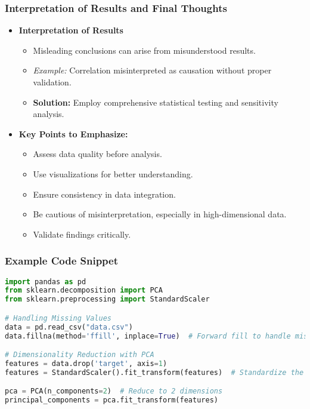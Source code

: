 \documentclass[aspectratio=169]{beamer}
\begin{document}
\begin{frame}
    \frametitle{Interpretation of Results and Final Thoughts}
    \begin{itemize}
        \item \textbf{Interpretation of Results}
            \begin{itemize}
                \item Misleading conclusions can arise from misunderstood results.
                \item \textit{Example:} Correlation misinterpreted as causation without proper validation.
                \item \textbf{Solution:} Employ comprehensive statistical testing and sensitivity analysis.
            \end{itemize}
        
        \item \textbf{Key Points to Emphasize:}
            \begin{itemize}
                \item Assess data quality before analysis.
                \item Use visualizations for better understanding.
                \item Ensure consistency in data integration.
                \item Be cautious of misinterpretation, especially in high-dimensional data.
                \item Validate findings critically.
            \end{itemize}
    \end{itemize}
\end{frame}

\begin{frame}[fragile]
    \frametitle{Example Code Snippet}
    \begin{lstlisting}[language=Python]
import pandas as pd
from sklearn.decomposition import PCA
from sklearn.preprocessing import StandardScaler

# Handling Missing Values
data = pd.read_csv("data.csv")
data.fillna(method='ffill', inplace=True)  # Forward fill to handle missing values

# Dimensionality Reduction with PCA
features = data.drop('target', axis=1)
features = StandardScaler().fit_transform(features)  # Standardize the features

pca = PCA(n_components=2)  # Reduce to 2 dimensions
principal_components = pca.fit_transform(features)
    \end{lstlisting}
\end{frame}
\end{document}
